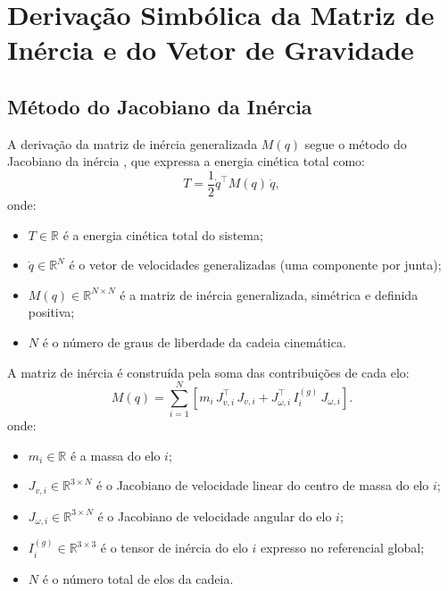 \section{Derivação Simbólica da Matriz de Inércia e do Vetor de Gravidade}
\label{sec:M_G}

\subsection{Método do Jacobiano da Inércia}

A derivação da matriz de inércia generalizada $M(q)$ segue o método do Jacobiano da inércia \cite{siciliano2009robotics}, que expressa a energia cinética total como:
\begin{equation}
    T = \frac{1}{2}\dot{q}^\top M(q)\,\dot{q},
    \label{eq:T_total}
\end{equation}
onde:
\begin{itemize}
    \item $T \in \mathbb{R}$ é a energia cinética total do sistema;
    \item $\dot{q} \in \mathbb{R}^{N}$ é o vetor de velocidades generalizadas (uma componente por junta);
    \item $M(q) \in \mathbb{R}^{N\times N}$ é a matriz de inércia generalizada, simétrica e definida positiva;
    \item $N$ é o número de graus de liberdade da cadeia cinemática.
\end{itemize}

A matriz de inércia é construída pela soma das contribuições de cada elo:
\begin{equation}
    M(q) = \sum_{i=1}^{N} \left[ m_i\, J_{v,i}^\top\, J_{v,i} + J_{\omega,i}^\top\, I_i^{(g)}\, J_{\omega,i} \right].
    \label{eq:M_jacobian}
\end{equation}
onde:
\begin{itemize}
    \item $m_i \in \mathbb{R}$ é a massa do elo $i$;
    \item $J_{v,i} \in \mathbb{R}^{3\times N}$ é o Jacobiano de velocidade linear do centro de massa do elo $i$;
    \item $J_{\omega,i} \in \mathbb{R}^{3\times N}$ é o Jacobiano de velocidade angular do elo $i$;
    \item $I_i^{(g)} \in \mathbb{R}^{3\times 3}$ é o tensor de inércia do elo $i$ expresso no referencial global;
    \item $N$ é o número total de elos da cadeia.
\end{itemize}

